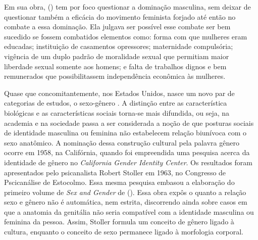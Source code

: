 Em sua obra,  (\citeyear{BEAUVOIR1967}) tem por foco questionar a dominação masculina, sem deixar de questionar também a eficácia do movimento feminista forjado até então no combate a essa dominação. Ela julgava ser possível esse combate ser bem sucedido se fossem combatidos elementos como: forma com que mulheres eram educadas; instituição de casamentos opressores; maternidade compulsória; vigência de um duplo padrão de moralidade sexual que permitiam maior liberdade sexual somente aos homens; e falta de trabalhos dignos e bem remunerados que possibilitassem independência econômica às mulheres. 

Quase que concomitantemente, nos Estados Unidos, nasce um novo par de categorias de estudos, o sexo-gênero \cite{FRAISSE2001,STOLKE2004,HARAWAY2004}. A distinção entre as característica biológicas e as características sociais torna-se mais difundida, ou seja, na academia e na sociedade passa a ser considerada a noção de que posturas sociais de identidade masculina ou feminina não estabelecem relação biunívoca com o sexo anatômico.
A nominação dessa construção cultural pela palavra gênero ocorre em 1958, na Califórnia, quando foi empreendida uma pesquisa acerca da identidade de gênero no \emph{California Gender Identity Center}. Os resultados foram apresentados pelo psicanalista Robert Stoller em 1963, no Congresso de Pscicanálise de Estocolmo. Essa mesma pesquisa embasou a elaboração do primeiro volume de \emph{Sex and Gender} de  (\citeyear{STOLLER1968}). Essa obra expôs o quanto a relação sexo e gênero não é automática, nem estrita, discorrendo ainda sobre casos em que a anatomia da genitália não seria compatível com a identidade masculina ou feminina da pessoa. Assim, Stoller formula um conceito de gênero ligado à cultura, enquanto o conceito de sexo permanece ligado à morfologia corporal.

